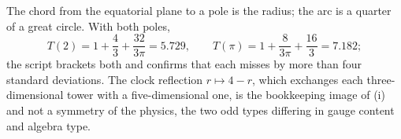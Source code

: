 The chord from the equatorial plane to a pole is the radius; the arc is a quarter of a great circle. With both poles,
\[
T(2) = 1 + \frac{4}{3} + \frac{32}{3\pi} = 5.729, \qquad T(\pi) = 1 + \frac{8}{3\pi} + \frac{16}{3} = 7.182 ;
\]
the script brackets both and confirms that each misses by more than four standard deviations. The clock reflection $r \mapsto 4 - r$, which exchanges each three-dimensional tower with a five-dimensional one, is the bookkeeping image of (i) and not a symmetry of the physics, the two odd types differing in gauge content and algebra type.
